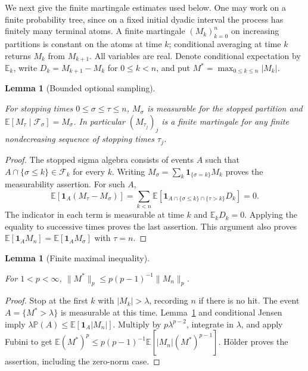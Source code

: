 \documentclass[11pt,letterpaper]{article}
\newtheorem{lemma}[theorem]{Lemma}
\theoremstyle{definition}
\newcommand{\E}{\mathbb E}
\newcommand{\ind}{\mathbf1}
\newcommand{\norm}[1]{\lVert#1\rVert}
\providecommand{\lean}[1]{}
\providecommand{\uses}[1]{}
\begin{document}
We next give the finite martingale estimates used below. One may work
on a finite probability tree, since on a fixed initial dyadic interval
the process has finitely many terminal atoms. A finite martingale
\((M_k)_{k=0}^n\) on increasing partitions is constant on the atoms
at time \(k\); conditional averaging at time \(k\) returns \(M_k\)
from \(M_{k+1}\). All variables are real. Denote conditional
expectation by \(\E_k\), write \(D_k=M_{k+1}-M_k\) for \(0\le k<n\),
and put \(M^*=\max_{0\le k\le n}|M_k|\).

\begin{lemma}[Bounded optional sampling]\label{bp:optional}
\lean{TwistedParaproduct.optional}
For stopping times \(0\le\sigma\le\tau\le n\), \(M_\sigma\) is
measurable for the stopped partition and
\(\E[M_\tau\mid\mathcal F_\sigma]=M_\sigma\). In particular
\((M_{\tau_j})_j\) is a finite martingale for any finite
nondecreasing sequence of stopping times \(\tau_j\).
\end{lemma}
\begin{proof}
The stopped sigma algebra consists of events \(A\) such that
\(A\cap\{\sigma\le k\}\in\mathcal F_k\) for every \(k\).
Writing \(M_\sigma=\sum_k\ind_{\{\sigma=k\}}M_k\) proves the
measurability assertion. For such \(A\),
\[
 \E[\ind_A(M_\tau-M_\sigma)]
   =\sum_{k<n}\E[\ind_{A\cap\{\sigma\le k\}\cap\{\tau>k\}}D_k]=0 .
\]
The indicator in each term is measurable at time \(k\) and
\(\E_kD_k=0\). Applying the equality to successive times proves the
last assertion. This argument also proves
\(\E[\ind_A M_n]=\E[\ind_A M_\sigma]\) with \(\tau=n\).
\end{proof}

\begin{lemma}[Finite maximal inequality]\label{bp:doob}
\lean{TwistedParaproduct.doob}
For \(1<p<\infty\), \(\norm{M^*}_p\le p(p-1)^{-1}\norm{M_n}_p\).
\end{lemma}
\begin{proof}
\uses{bp:optional}
Stop at the first \(k\) with \(|M_k|>\lambda\), recording \(n\) if
there is no hit. The event \(A=\{M^*>\lambda\}\) is measurable at
this time. Lemma~\ref{bp:optional} and conditional Jensen imply
\(\lambda\mathbb P(A)\le\E[\ind_A|M_n|]\). Multiply by
\(p\lambda^{p-2}\), integrate in \(\lambda\), and apply Fubini
to get
\(\E(M^*)^p\le p(p-1)^{-1}\E[|M_n|(M^*)^{p-1}]\).
H\"older proves the assertion, including the zero-norm case.
\end{proof}
\end{document}
